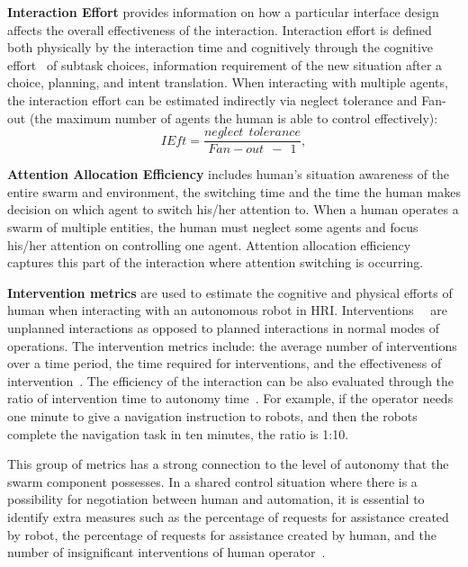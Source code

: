 \documentclass[journal]{IEEEtran}
\begin{document}
\textbf{Interaction Effort} provides information on how a particular interface design affects the overall effectiveness of the interaction. Interaction effort is defined both physically by the interaction time and cognitively through the cognitive effort~\cite{olsen2003metrics} of subtask choices, information requirement of the new situation after a choice, planning, and intent translation. When interacting with multiple agents, the interaction effort can be estimated indirectly via neglect tolerance and Fan-out (the maximum number of agents the human is able to control effectively):
\begin{equation}
    IEft = \frac{neglect\ \ tolerance}{Fan-out \ \ -\ \ 1},
\end{equation}

\textbf{Attention Allocation Efficiency} includes human's situation awareness of the entire swarm and environment, the switching time and the time the human makes decision on which agent to switch his/her attention to. When a human operates a swarm of multiple entities, the human must neglect some agents and focus his/her attention on controlling one agent. Attention allocation efficiency captures this part of the interaction where attention switching is occurring. 

\textbf{Intervention metrics} are used to estimate the cognitive and physical efforts of human when interacting with an autonomous robot in HRI. Interventions~\cite{huang2003toward}~\cite{steinfeld2006common} are unplanned interactions as opposed to planned interactions in normal modes of operations. The intervention metrics include: the average number of interventions over a time period, the time required for interventions, and the effectiveness of intervention~\cite{scholtz2003evaluation}. The efficiency of the interaction can be also evaluated through the ratio of intervention time to autonomy time~\cite{yanco2004beyond}. For example, if the operator needs one minute to give a navigation instruction to robots, and then the robots complete the navigation task in ten minutes, the ratio is 1:10.

This group of metrics has a strong connection to the level of autonomy that the swarm component possesses. In a shared control situation where there is a possibility for negotiation between human and automation, it is essential to identify extra measures such as the percentage of requests for assistance created by robot, the percentage of requests for assistance created by human, and the number of insignificant interventions of human operator~\cite{steinfeld2006common}.
\end{document}
